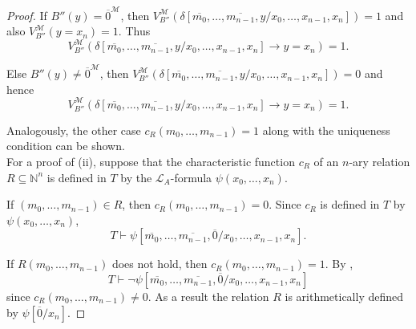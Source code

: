 \begin{proof}
If $B''(y) = \overline{0}^\mathcal{M}$, then $V_{B''}^\mathcal{M}(\delta[\overline{m_0}, \ldots, \overline{m_{n-1}},y/x_0, \ldots, x_{n-1}, x_n]) = 1$ and also $V_{B''}^\mathcal{M}(y = x_n)=1$. Thus 
\[V_{B''}^\mathcal{M}(\delta[\overline{m_0}, \ldots, \overline{m_{n-1}},y/x_0, \ldots, x_{n-1}, x_n] \rightarrow y = x_n)=1. \]

Else $B''(y) \neq \overline{0}^\mathcal{M}$, then $V_{B''}^\mathcal{M}(\delta[\overline{m_0}, \ldots, \overline{m_{n-1}},y/x_0, \ldots, x_{n-1}, x_n]) = 0$ and hence
\[V_{B''}^\mathcal{M}(\delta[\overline{m_0}, \ldots, \overline{m_{n-1}},y/x_0, \ldots, x_{n-1}, x_n] \rightarrow y = x_n)=1. \]

Analogously, the other case $c_R(m_0, \ldots, m_{n-1}) = 1$ along with the uniqueness condition can be shown.
\\

For a proof of (ii), suppose that the characteristic function $c_R$ of an $n$-ary relation $R\subseteq \mathbb{N}^n$ is defined in $T$ by the $\mathcal{L}_A$-formula $\psi(x_0, \ldots,x_{n})$. 

If $(m_0, \ldots, m_{n-1}) \in R$, then $c_R(m_0,\ldots,m_{n-1}) = 0$. Since $c_R$ is defined in $T$ by $\psi(x_0, \ldots, x_n)$, \[T \vdash  \psi[\overline{m_0}, \ldots, \overline{m_{n-1}}, \overline{0}/x_0, \ldots,x_{n-1}, x_n]. \] 

If $R(m_0, \ldots, m_{n-1})$ does not hold, then $c_R(m_0,\ldots,m_{n-1}) = 1$. By , \[T \vdash  \lnot \psi[\overline{m_0}, \ldots, \overline{m_{n-1}}, \overline{0}/x_0, \ldots,x_{n-1}, x_n] \]
since $c_R(m_0,\ldots,m_{n-1}) \neq 0$. As a result the relation $R$ is arithmetically defined by $\psi[\overline{0}/x_n]$.
\end{proof}

